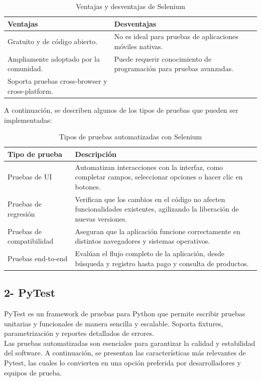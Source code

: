 \documentclass[man, floatsintext]{apa7}
\begin{document}
	\begin{table}[h!]
		\centering
		\begin{tabular}{|p{6cm}|p{6cm}|}
			\hline
			\textbf{Ventajas} & \textbf{Desventajas} \\
			\hline
			Gratuito y de código abierto. & No es ideal para pruebas de aplicaciones móviles nativas. \\ \hline
			Ampliamente adoptado por la comunidad. & Puede requerir conocimiento de programación para pruebas avanzadas. \\ \hline
			Soporta pruebas cross-browser y cross-platform. & \\ \hline
		\end{tabular}
		\caption{Ventajas y desventajas de Selenium \cite{selenium_documentation}}
		\label{tab:ventajas_desventajas_selenium}
	\end{table}
	
	A continuación, se describen algunos de los tipos de pruebas que pueden ser implementadas:
	
	\begin{table}[h!]
		\centering
		\begin{tabular}{|p{4cm}|p{10cm}|}
			\hline
			\textbf{Tipo de prueba} & \textbf{Descripción} \\ \hline
			Pruebas de UI & Automatizan interacciones con la interfaz, como completar campos, seleccionar opciones o hacer clic en botones. \\ \hline
			Pruebas de regresión & Verifican que los cambios en el código no afecten funcionalidades existentes, agilizando la liberación de nuevas versiones. \\ \hline
			Pruebas de compatibilidad & Aseguran que la aplicación funcione correctamente en distintos navegadores y sistemas operativos. \\ \hline
			Pruebas end-to-end & Evalúan el flujo completo de la aplicación, desde búsqueda y registro hasta pago y consulta de productos. \\ \hline
		\end{tabular}
		\caption{Tipos de pruebas automatizadas con Selenium}
		\label{tab:tipos_pruebas_selenium}
	\end{table}
	\FloatBarrier

	\subsection{2- PyTest}
	PyTest es un framework de pruebas para Python que permite escribir pruebas unitarias y funcionales de manera sencilla y escalable. Soporta fixtures, parametrización y reportes detallados de errores.\cite{circleci_pytest_2024}\\
	Las pruebas automatizadas son esenciales para garantizar la calidad y estabilidad del software. A continuación, se presentan las características más relevantes de Pytest, las cuales lo convierten en una opción preferida por desarrolladores y equipos de prueba.\\
	
\end{document}
